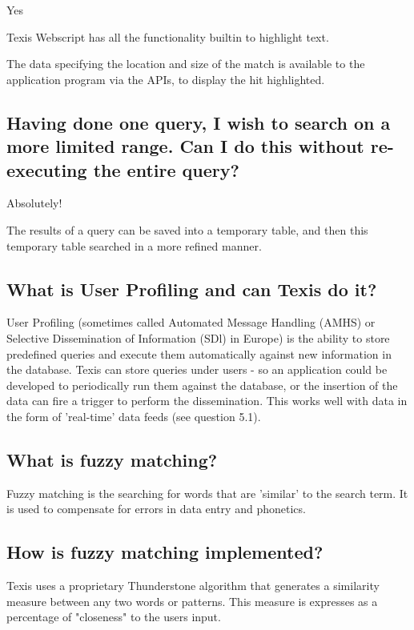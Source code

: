 Yes

Texis Webscript has all the functionality builtin to highlight text.

The data specifying the location and size of the match is
available to the application program via the APIs, to display the hit
highlighted.

\subsection{Having done one query, I wish to search on a more limited range.  Can
I do this without re-executing the entire query?}

Absolutely!

The results of a query can be saved into a temporary table, and then this
temporary table searched in a more refined manner.

\subsection{What is User Profiling and can Texis do it?}

User Profiling (sometimes called Automated Message Handling (AMHS) or
Selective Dissemination of Information (SDl) in Europe) is the ability to
store predefined queries and execute them automatically against new
information in the database.  Texis can store queries under users - so an
application could be developed to periodically run them against the
database, or the insertion of the data can fire a trigger to perform the
dissemination.  This works well with data in the form of 'real-time' data
feeds (see question 5.1).

\subsection{What is fuzzy matching?}

Fuzzy matching is the searching for words that are 'similar' to the search term. It is
used to compensate for errors in data entry and phonetics.

\subsection{How is fuzzy matching implemented?}

Texis uses a proprietary Thunderstone algorithm that generates a
similarity measure between any two words or patterns. This measure
is expresses as a percentage of "closeness" to the users input.


